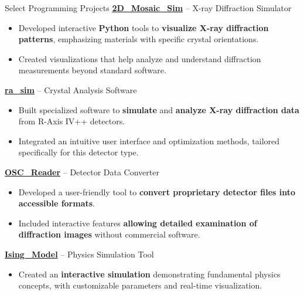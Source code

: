 \begin{rubric}{Select Programming Projects}
\entry*[2025--Present]%
  \textbf{\href{https://github.com/DVBeckwitt/2D_Mosaic_Sim}{2D\_Mosaic\_Sim}} – X-ray Diffraction Simulator%
  \begin{itemize}
    \item Developed interactive \textbf{Python} tools to \textbf{visualize X-ray diffraction patterns}, emphasizing materials with specific crystal orientations.
    \item Created visualizations that help analyze and understand diffraction measurements beyond standard software.
  \end{itemize}

  \entry*[2024--Present]%
  \textbf{\href{https://github.com/DVBeckwitt/ra_sim}{ra\_sim}} – Crystal Analysis Software%
  \begin{itemize}
    \item Built specialized software to \textbf{simulate} and \textbf{analyze X-ray diffraction data} from R-Axis IV++ detectors.
    \item Integrated an intuitive user interface and optimization methods, tailored specifically for this detector type.
  \end{itemize}

  \entry*[2024]%
  \textbf{\href{https://github.com/DVBeckwitt/OSC_Reader}{OSC\_Reader}} – Detector Data Converter%
  \begin{itemize}
    \item Developed a user-friendly tool to \textbf{convert proprietary detector files into accessible formats}.
    \item Included interactive features \textbf{allowing detailed examination of diffraction images} without commercial software.
  \end{itemize}

  \entry*[2025]%
  \textbf{\href{https://github.com/DVBeckwitt/Ising_Model}{Ising\_Model}} – Physics Simulation Tool%
  \begin{itemize}
    \item Created an \textbf{interactive simulation} demonstrating fundamental physics concepts, with customizable parameters and real-time visualization.
  \end{itemize}
\end{rubric}
